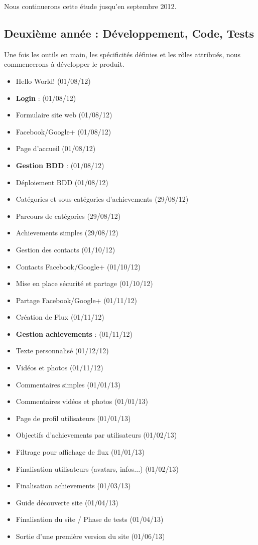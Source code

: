 \documentclass{life-fr}
\begin{document}
Nous continuerons cette étude jusqu'en septembre 2012.\\

\newpage

\subsection{ Deuxième année : Développement, Code, Tests}
Une fois les outils en main, les spécificités définies et les rôles attribués, nous commencerons à développer le produit.\\
\begin{itemize}
  \item Hello World! (01/08/12)
  \item \textbf{Login} : (01/08/12)
  \item Formulaire site web (01/08/12)
  \item Facebook/Google+ (01/08/12)
  \item Page d'accueil (01/08/12)
  \item \textbf{Gestion BDD} : (01/08/12)
  \item Déploiement BDD (01/08/12)
  \item Catégories et sous-catégories d'achievements (29/08/12)
  \item Parcours de catégories (29/08/12)
  \item Achievements simples (29/08/12)
  \item Gestion des contacts (01/10/12)
  \item Contacts Facebook/Google+ (01/10/12)
  \item Mise en place sécurité et partage (01/10/12)
  \item Partage Facebook/Google+ (01/11/12)
  \item Création de Flux (01/11/12)
  \item \textbf{Gestion achievements} : (01/11/12)
  \item Texte personnalisé (01/12/12)
  \item Vidéos et photos (01/11/12)
  \item Commentaires simples (01/01/13)
  \item Commentaires vidéos et photos (01/01/13)
  \item Page de profil utilisateurs (01/01/13)
  \item Objectifs d'achievements par utilisateurs (01/02/13)
  \item Filtrage pour affichage de flux (01/01/13)
  \item Finalisation utilisateurs (avatars, infos...) (01/02/13)
  \item Finalisation achievements (01/03/13)
  \item Guide découverte site (01/04/13)
  \item Finalisation du site / Phase de tests (01/04/13)
  \item Sortie d'une première version du site (01/06/13)
\end{itemize}
\end{document}
